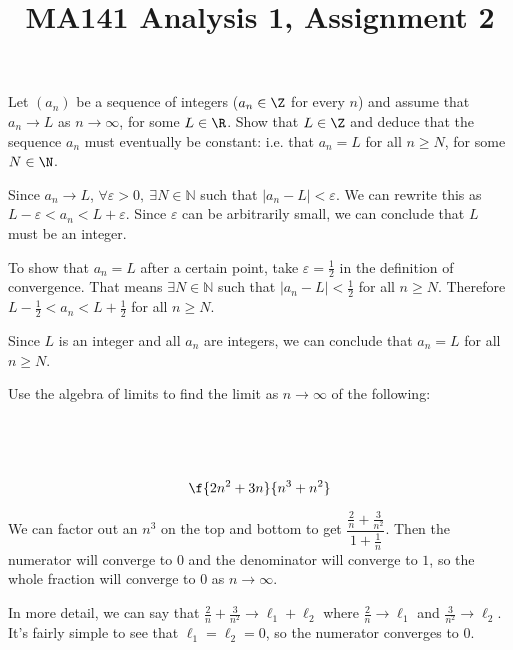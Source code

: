 \documentclass[a4paper]{article}
\title{MA141 Analysis 1, Assignment 2}
\begin{document}
\maketitle

\setlength{\parindent}{0em}
\setlength{\parskip}{1em}


\begin{questionbody}
Let $(a_n)$ be a sequence of integers ($a_n \in \Z$ for every $n$) and assume that $a_n \to L$ as $n \to \infty$, for some $L \in \R$. Show that $L \in \Z$ and deduce that the sequence $a_n$ must eventually be constant: i.e. that $a_n = L$ for all $n \ge N$, for some $N \in \N$.
\end{questionbody}

Since $a_n \to L$, $\forall \varepsilon > 0,\ \exists N \in \mathbb N$ such that $|a_n - L| < \varepsilon$. We can rewrite this as $L - \varepsilon < a_n < L + \varepsilon$. Since $\varepsilon$ can be arbitrarily small, we can conclude that $L$ must be an integer.

To show that $a_n = L$ after a certain point, take $\varepsilon = \frac12$ in the definition of convergence. That means $\exists N \in \mathbb N$ such that $|a_n - L| < \frac12$ for all $n \ge N$. Therefore $L - \frac12 < a_n < L + \frac12$ for all $n \ge N$.

Since $L$ is an integer and all $a_n$ are integers, we can conclude that $a_n = L$ for all $n \ge N$.


\begin{questionbody}
Use the algebra of limits to find the limit as $n \to \infty$ of the following:
\end{questionbody}

\subsection{~} %

\begin{questionbody}
\[ \f{2n^2 + 3n}{n^3 + n^2} \]
\end{questionbody}

We can factor out an $n^3$ on the top and bottom to get $\dfrac{\frac{2}{n} + \frac{3}{n^2}}{1 + \frac{1}{n}}$. Then the numerator will converge to $0$ and the denominator will converge to $1$, so the whole fraction will converge to $0$ as $n \to \infty$.

In more detail, we can say that $\frac2n + \frac3{n^2} \to \ell_1 + \ell_2$ where $\frac2n \to \ell_1$ and $\frac3{n^2} \to \ell_2$. It's fairly simple to see that $\ell_1 = \ell_2 = 0$, so the numerator converges to $0$.
\end{document}
